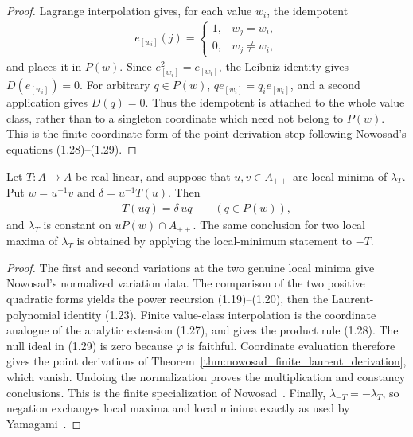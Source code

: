 \begin{proof}
    \leanok
    Lagrange interpolation gives, for each value $w_i$, the idempotent
    \begin{align}
        e_{[w_i]}(j)=
        \begin{cases}
            1,&w_j=w_i,\\
            0,&w_j\ne w_i,
        \end{cases}
    \end{align}
    and places it in $P(w)$.  Since $e_{[w_i]}^2=e_{[w_i]}$, the Leibniz
    identity gives $D(e_{[w_i]})=0$.  For arbitrary $q\in P(w)$,
    $qe_{[w_i]}=q_i e_{[w_i]}$, and a second application gives $D(q)=0$.
    Thus the idempotent is attached to the whole value class, rather than to
    a singleton coordinate which need not belong to $P(w)$.  This is the
    finite-coordinate form of the point-derivation step following Nowosad's
    equations (1.28)--(1.29).
\end{proof}

\begin{theorem}
    \label{thm:nowosad_finite_theorem_one_eight}
    \leanok
    Let $T\colon A\to A$ be real linear, and suppose that $u,v\in A_{++}$
    are local minima of $\lambda_T$.  Put $w=u^{-1}v$ and
    $\delta=u^{-1}T(u)$.  Then
    \begin{align}
        T(uq)=\delta\,uq\qquad(q\in P(w)),
    \end{align}
    and $\lambda_T$ is constant on $uP(w)\cap A_{++}$.
    The same conclusion for two local maxima of $\lambda_T$ is obtained by
    applying the local-minimum statement to $-T$.
\end{theorem}

\begin{proof}
    \leanok
    The first and second variations at the two genuine local minima give
    Nowosad's normalized variation data.  The comparison of the two positive
    quadratic forms yields the power recursion (1.19)--(1.20), then the
    Laurent-polynomial identity (1.23).  Finite value-class interpolation is
    the coordinate analogue of the analytic extension (1.27), and gives the
    product rule (1.28).  The null ideal in (1.29) is zero because $\varphi$ is
    faithful.  Coordinate evaluation therefore gives the point derivations
    of Theorem~\ref{thm:nowosad_finite_laurent_derivation}, which vanish.
    Undoing the normalization proves the multiplication and constancy
    conclusions.  This is the finite specialization of
    Nowosad~\cite[pp.~409--418]{Nowosad1968Isoperimetric}.  Finally,
    $\lambda_{-T}=-\lambda_T$, so negation exchanges local maxima and local
    minima exactly as used by Yamagami~\cite[p.~522]{Yamagami1993Cyclic}.
\end{proof}

